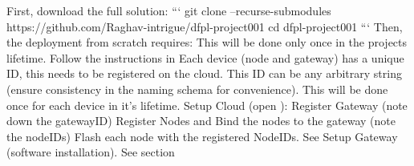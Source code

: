First, download the full solution:\markdownRendererInterblockSeparator
{}``` git clone --recurse-submodules \markdownRendererBackslash{}\markdownRendererInterblockSeparator
{}https://github.com/Raghav-intrigue/dfpl-project001\markdownRendererInterblockSeparator
{}cd dfpl-project001 ```\markdownRendererInterblockSeparator
{}Then, the deployment from scratch requires:\markdownRendererInterblockSeparator
{}\markdownRendererUlBeginTight
\markdownRendererUlItem {}\markdownRendererUlItemEnd 
\markdownRendererUlEndTight \markdownRendererInterblockSeparator
{}This will be done only once in the projects lifetime.\markdownRendererInterblockSeparator
{}Follow the instructions in \markdownRendererInterblockSeparator
{}\markdownRendererUlBegin
\markdownRendererUlItem {}\markdownRendererInterblockSeparator
{}Each device (node and gateway) has a unique ID, this needs to be registered on the cloud. This ID can be any arbitrary string (ensure consistency in the naming schema for convenience).\markdownRendererInterblockSeparator
{}This will be done once for each device in it's lifetime.\markdownRendererInterblockSeparator
{}\markdownRendererOlBeginTight
{}Setup Cloud (open ):\markdownRendererOlItemEnd 
\markdownRendererOlEndTight \markdownRendererInterblockSeparator
{}\markdownRendererUlBeginTight
\markdownRendererUlItem Register Gateway (note down the gatewayID)\markdownRendererUlItemEnd 
\markdownRendererUlItem Register Nodes and Bind the nodes to the gateway (note the nodeIDs)\markdownRendererUlItemEnd 
\markdownRendererUlEndTight \markdownRendererInterblockSeparator
{}\markdownRendererOlBegin
{}Flash each node with the registered NodeIDs. See \markdownRendererOlItemEnd 
{}Setup Gateway (software installation). See section \markdownRendererOlItemEnd 
\markdownRendererOlEnd \markdownRendererUlItemEnd 
\markdownRendererUlItem {}\markdownRendererUlItemEnd 
